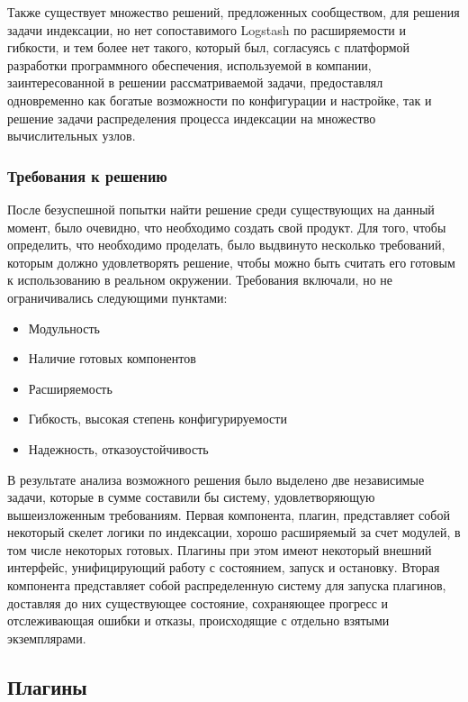 Также существует множество решений, предложенных сообществом, для решения задачи индексации, но нет сопоставимого Logstash по расширяемости и гибкости, и тем более нет такого, который был, согласуясь с платформой разработки программного обеспечения, используемой в компании, заинтересованной в решении рассматриваемой задачи, предоставлял одновременно как богатые возможности по конфигурации и настройке, так и решение задачи распределения процесса индексации на множество вычислительных узлов.

\subsubsection{Требования к решению}

После безуспешной попытки найти решение среди существующих на данный момент, было очевидно, что необходимо создать свой продукт. Для того, чтобы определить, что необходимо проделать, было выдвинуто несколько требований, которым должно удовлетворять решение, чтобы можно быть считать его готовым к использованию в реальном окружении. Требования включали, но не ограничивались следующими пунктами:

\begin{itemize}
	\item Модульность
	\item Наличие готовых компонентов
	\item Расширяемость
	\item Гибкость, высокая степень конфигурируемости
	\item Надежность, отказоустойчивость
\end{itemize}

В результате анализа возможного решения было выделено две независимые задачи, которые в сумме составили бы систему, удовлетворяющую вышеизложенным требованиям. Первая компонента, плагин, представляет собой некоторый скелет логики по индексации, хорошо расширяемый за счет модулей, в том числе некоторых готовых. Плагины при этом имеют некоторый внешний интерфейс, унифицирующий работу с состоянием, запуск и остановку. Вторая компонента представляет собой распределенную систему для запуска плагинов, доставляя до них существующее состояние, сохраняющее прогресс и отслеживающая ошибки и отказы, происходящие с отдельно взятыми экземплярами.

\subsection{Плагины}

